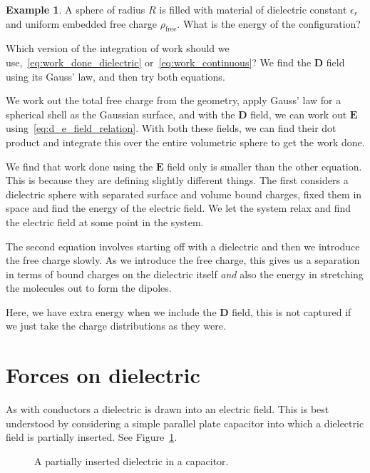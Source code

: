 \documentclass[12pt,chapterprefix=false,dvipsnames]{scrbook}
\theoremstyle{dotless}
\theoremstyle{definition}
\newtheorem{protoexample}{Example}[section]
\newenvironment{example}
{\colorlet{shadecolor}{red!15}\begin{shaded}\begin{protoexample}}
			{\end{protoexample}\end{shaded}}
\begin{document}
\begin{example}
	A sphere of radius $R$ is filled with
	material of dielectric constant $\epsilon_r$ and
	uniform embedded free charge $\rho_{\mathrm{free}}$. What is the
	energy of the configuration?

	Which version of the integration of work should we
	use,~\ref{eq:work_done_dielectric} or~\ref{eq:work_continuous}? We find
	the $\bm{D}$ field using its Gauss' law, and then
	try both equations.

	We work out the total free charge from the geometry, apply
	Gauss' law for a spherical shell as the Gaussian surface, and
	with the $\bm{D}$ field, we can work out
	$\bm{E}$ using~\ref{eq:d_e_field_relation}. With both
	these fields, we can find their dot product and integrate this
	over the entire volumetric sphere to get the work done.

	We find that work done using the $\bm{E}$ field
	only is smaller than the other equation. This is because they
	are defining slightly different things. The first considers a
	dielectric sphere with separated surface and volume bound
	charges, fixed them in space and find the energy of the electric
	field. We let the system relax and find the electric field at
	some point in the system.

	The second equation involves starting off with a dielectric and
	then we introduce the free charge slowly. As we introduce the
	free charge, this gives us a separation in terms of bound
	charges on the dielectric itself \textit{and} also
	the energy in stretching the molecules out to form the dipoles.

	Here, we have extra energy when we include the
	$\bm{D}$ field, this is not captured if we just
	take the charge distributions as they were.
\end{example}

\section{Forces on dielectric}%
\label{sec:forces_on_dielectric}

As with conductors a dielectric is drawn into an electric field.
This is best understood by considering a simple parallel plate
capacitor into which a dielectric field is partially inserted.
See Figure~\ref{fig:dielectric_in_capacitor}.

\begin{figure}[htpb]
	\centering
	
	\caption{A partially inserted dielectric in a capacitor.}%
	\label{fig:dielectric_in_capacitor}
\end{figure}
\end{document}
